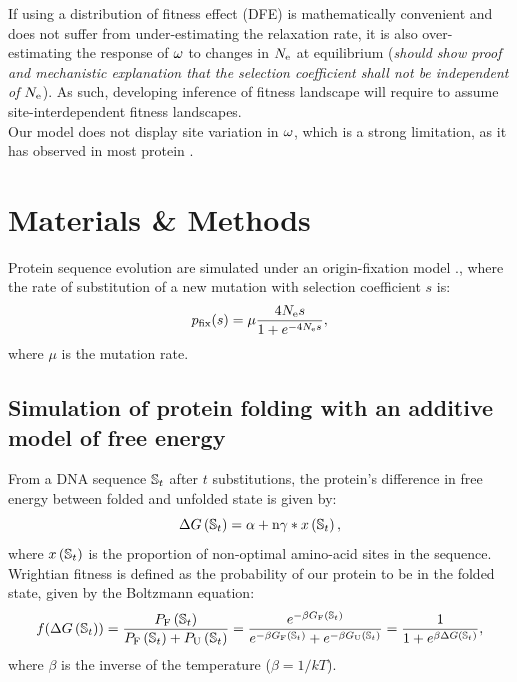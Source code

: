 \documentclass{article}
\begin{document}
If using a distribution of fitness effect (DFE) is mathematically convenient and does not suffer from under-estimating the relaxation rate, it is also over-estimating the response of $\omega$ to changes in $N_{\mathrm{e}}$ at equilibrium (\textit{should show proof and mechanistic explanation that the selection coefficient shall not be independent of $N_{\mathrm{e}}$}).
As such, developing inference of fitness landscape will require to assume site-interdependent fitness landscapes.\\

Our model does not display site variation in $\omega$, which is a strong limitation, as it has observed in most protein \cite{Echave2017}.
\section*{Materials \& Methods}

Protein sequence evolution are simulated under an origin-fixation model \cite{McCandlish2014}., where the rate of substitution of a new mutation with selection coefficient $s$ is:
\begin{equation}
p_{\text{fix}}(s) = \mu \dfrac{4 N_{\mathrm{e}} s}{1 + e^{- 4 N_{\mathrm{e}} s }}, 
\end{equation}
where $\mu$ is the mutation rate.

\subsection*{Simulation of protein folding with an additive model of free energy}
\label{MatMet:folding}
From a DNA sequence $\mathbb{S}_{t}$ after $t$ substitutions, the protein's difference in free energy between folded and unfolded state is given by:
\begin{equation*}
\Delta G\left(\mathbb{S}_{t}\right) = \alpha + \text{n} \gamma * x\left(\mathbb{S}_{t}\right), 
\end{equation*}
where $x\left(\mathbb{S}_{t}\right)$ is the proportion of non-optimal amino-acid sites in the sequence.
Wrightian fitness is defined as the probability of our protein to be in the folded state, given by the Boltzmann equation: 
\begin{equation}
f(\Delta G\left(\mathbb{S}_{t}\right)) = \dfrac{P_{\mathrm{F}}\left(\mathbb{S}_{t}\right)}{P_{\mathrm{F}}\left(\mathbb{S}_{t}\right) + P_{\mathrm{U}}\left(\mathbb{S}_{t}\right)} = \dfrac{e^{-\beta G_{\mathrm{F}}\left(\mathbb{S}_{t}\right) }}{e^{-\beta G_{\mathrm{F}} \left(\mathbb{S}_{t}\right) } + e^{-\beta G_{\mathrm{U}}\left(\mathbb{S}_{t}\right) }} = \dfrac{1}{1 + e^{\beta \Delta G\left(\mathbb{S}_{t}\right) }}, 
\end{equation}
where $\beta$ is the inverse of the temperature ($\beta=1/kT$).
\end{document}
